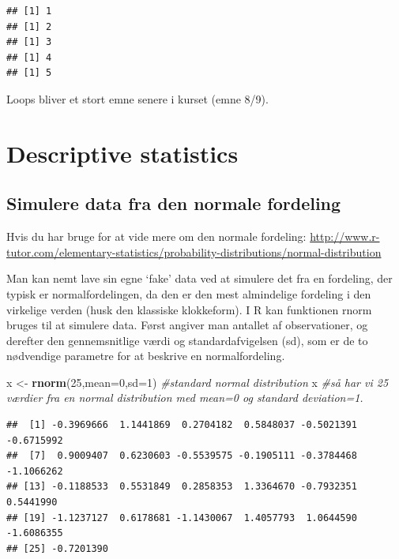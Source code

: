 \documentclass[
]{book}
\newenvironment{Shaded}{\begin{snugshade}}{\end{snugshade}}
\newcommand{\AttributeTok}[1]{\textcolor[rgb]{0.13,0.29,0.53}{#1}}
\newcommand{\CommentTok}[1]{\textcolor[rgb]{0.56,0.35,0.01}{\textit{#1}}}
\newcommand{\DecValTok}[1]{\textcolor[rgb]{0.00,0.00,0.81}{#1}}
\newcommand{\FunctionTok}[1]{\textcolor[rgb]{0.13,0.29,0.53}{\textbf{#1}}}
\newcommand{\NormalTok}[1]{#1}
\newcommand{\OtherTok}[1]{\textcolor[rgb]{0.56,0.35,0.01}{#1}}
\begin{document}
\begin{verbatim}
## [1] 1
## [1] 2
## [1] 3
## [1] 4
## [1] 5
\end{verbatim}

Loops bliver et stort emne senere i kurset (emne 8/9).

\section{Descriptive statistics}\label{descriptive-statistics}

\subsection{Simulere data fra den normale fordeling}\label{simulere-data-fra-den-normale-fordeling}

Hvis du har bruge for at vide mere om den normale fordeling: \url{http://www.r-tutor.com/elementary-statistics/probability-distributions/normal-distribution}

Man kan nemt lave sin egne `fake' data ved at simulere det fra en fordeling, der typisk er normalfordelingen, da den er den mest almindelige fordeling i den virkelige verden (husk den klassiske klokkeform). I R kan funktionen rnorm bruges til at simulere data. Først angiver man antallet af observationer, og derefter den gennemsnitlige værdi og standardafvigelsen (sd), som er de to nødvendige parametre for at beskrive en normalfordeling.

\begin{Shaded}
\begin{Highlighting}[]
\NormalTok{x }\OtherTok{\textless{}{-}} \FunctionTok{rnorm}\NormalTok{(}\DecValTok{25}\NormalTok{,}\AttributeTok{mean=}\DecValTok{0}\NormalTok{,}\AttributeTok{sd=}\DecValTok{1}\NormalTok{) }\CommentTok{\#standard normal distribution}
\NormalTok{x }\CommentTok{\#så har vi 25 værdier fra en normal distribution med mean=0 og standard deviation=1.}
\end{Highlighting}
\end{Shaded}

\begin{verbatim}
##  [1] -0.3969666  1.1441869  0.2704182  0.5848037 -0.5021391 -0.6715992
##  [7]  0.9009407  0.6230603 -0.5539575 -0.1905111 -0.3784468 -1.1066262
## [13] -0.1188533  0.5531849  0.2858353  1.3364670 -0.7932351  0.5441990
## [19] -1.1237127  0.6178681 -1.1430067  1.4057793  1.0644590 -1.6086355
## [25] -0.7201390
\end{verbatim}
\end{document}
